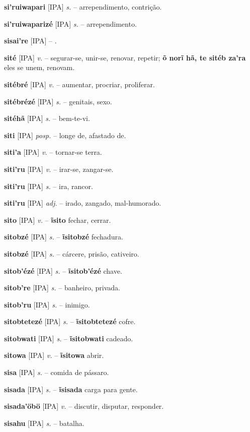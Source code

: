 \textbf{si'ruiwapari} [IPA] \textit{s.} -- arrependimento, contrição.

\textbf{si'ruiwaparizé} [IPA] \textit{s.} -- arrependimento.

\textbf{sisai're} [IPA] \textit{} -- .

\textbf{sité} [IPA] \textit{v.} -- segurar-se, unir-se, renovar, repetir; \textbf{õ norĩ hã, te sitéb za'ra} eles se unem, renovam.

\textbf{sitébré} [IPA] \textit{v.} -- aumentar, procriar, proliferar.

\textbf{sitébrézé} [IPA] \textit{s.} -- genitais, sexo.

\textbf{sitéhã} [IPA] \textit{s.} -- bem-te-vi.

\textbf{siti} [IPA] \textit{posp.} -- longe de, afastado de.

\textbf{siti'a} [IPA] \textit{v.} -- tornar-se terra.

\textbf{siti'ru} [IPA] \textit{v.} -- irar-se, zangar-se.

\textbf{siti'ru} [IPA] \textit{s.} -- ira, rancor.

\textbf{siti'ru} [IPA] \textit{adj.} -- irado, zangado, mal-humorado.

\textbf{sito} [IPA] \textit{v.} -- \textbf{ĩsito} fechar, cerrar.

\textbf{sitobzé} [IPA] \textit{s.} -- \textbf{ĩsitobzé} fechadura.

\textbf{sitobzé} [IPA] \textit{s.} -- cárcere, prisão, cativeiro.

\textbf{sitob'ézé} [IPA] \textit{s.} -- \textbf{ĩsitob'ézé} chave.

\textbf{sitob're} [IPA] \textit{s.} -- banheiro, privada.

\textbf{sitob'ru} [IPA] \textit{s.} -- inimigo.

\textbf{sitobtetezé} [IPA] \textit{s.} -- \textbf{ĩsitobtetezé} cofre.

\textbf{sitobwati} [IPA] \textit{s.} -- \textbf{ĩsitobwati} cadeado.

\textbf{sitowa} [IPA] \textit{v.} -- \textbf{ĩsitowa} abrir.

\textbf{sisa} [IPA] \textit{s.} -- comida de pássaro.

\textbf{sisada} [IPA] \textit{s.} -- \textbf{ĩsisada} carga para gente.

\textbf{sisada'öbö} [IPA] \textit{v.} -- discutir, disputar, responder.

\textbf{sisahu} [IPA] \textit{s.} -- batalha.

